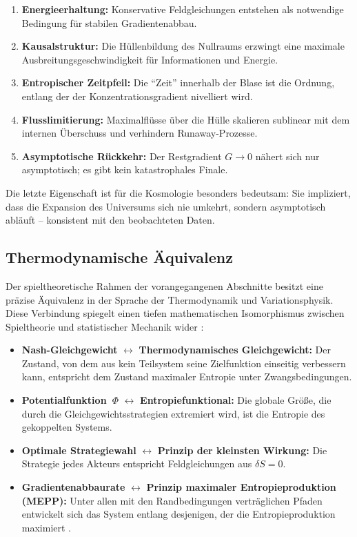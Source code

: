 \documentclass[aps,prd,twocolumn,superscriptaddress,nofootinbib]{revtex4-2}
\begin{document}
\begin{enumerate}
\item \textbf{Energieerhaltung:} Konservative Feldgleichungen entstehen als notwendige Bedingung f\"ur stabilen Gradientenabbau.
\item \textbf{Kausalstruktur:} Die H\"ullenbildung des Nullraums erzwingt eine maximale Ausbreitungsgeschwindigkeit f\"ur Informationen und Energie.
\item \textbf{Entropischer Zeitpfeil:} Die ``Zeit'' innerhalb der Blase ist die Ordnung, entlang der der Konzentrationsgradient nivelliert wird.
\item \textbf{Flusslimitierung:} Maximalfl\"usse \"uber die H\"ulle skalieren sublinear mit dem internen \"Uberschuss und verhindern Runaway-Prozesse.
\item \textbf{Asymptotische R\"uckkehr:} Der Restgradient $G \to 0$ n\"ahert sich nur asymptotisch; es gibt kein katastrophales Finale.
\end{enumerate}

Die letzte Eigenschaft ist f\"ur die Kosmologie besonders bedeutsam: Sie impliziert, dass die Expansion des Universums sich nie umkehrt, sondern asymptotisch abl\"auft -- konsistent mit den beobachteten Daten.

\subsection{Thermodynamische \"Aquivalenz}
\label{subsec:thermodynamik}

Der spieltheoretische Rahmen der vorangegangenen Abschnitte besitzt eine pr\"azise \"Aquivalenz in der Sprache der Thermodynamik und Variationsphysik. Diese Verbindung spiegelt einen tiefen mathematischen Isomorphismus zwischen Spieltheorie und statistischer Mechanik wider \cite{Wolpert2006}:

\begin{itemize}
\item \textbf{Nash-Gleichgewicht} $\leftrightarrow$ \textbf{Thermodynamisches Gleichgewicht:} Der Zustand, von dem aus kein Teilsystem seine Zielfunktion einseitig verbessern kann, entspricht dem Zustand maximaler Entropie unter Zwangsbedingungen.
\item \textbf{Potentialfunktion~$\Phi$} $\leftrightarrow$ \textbf{Entropiefunktional:} Die globale Gr\"o\ss{}e, die durch die Gleichgewichtsstrategien extremiert wird, ist die Entropie des gekoppelten Systems.
\item \textbf{Optimale Strategiewahl} $\leftrightarrow$ \textbf{Prinzip der kleinsten Wirkung:} Die Strategie jedes Akteurs entspricht Feldgleichungen aus $\delta S = 0$.
\item \textbf{Gradientenabbaurate} $\leftrightarrow$ \textbf{Prinzip maximaler Entropieproduktion (MEPP):} Unter allen mit den Randbedingungen vertr\"aglichen Pfaden entwickelt sich das System entlang desjenigen, der die Entropieproduktion maximiert \cite{Dewar2003}.
\end{itemize}
\end{document}
